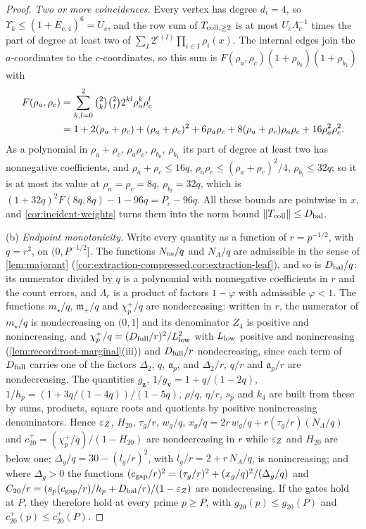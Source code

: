 \begin{proof}
\emph{Two or more coincidences.} Every vertex has degree $d_i=4$, so
$\Upsilon_k\le(1+E_{c,4})^6=U_c$, and the row sum of $T_{\rm coll,\ge2}$ is at
most $U_c\Lambda_c^{-1}$ times the part of degree at least two of
$\sum_I2^{e(I)}\prod_{i\in I}\rho_i(x)$. The internal edges join the
$a$-coordinates to the $c$-coordinates, so this sum is
$F(\rho_a,\rho_c)(1+\rho_{b_0})(1+\rho_{b_1})$ with
\begin{align*}
 F(\rho_a,\rho_c)&=\sum_{k,l=0}^2\tbinom2k\tbinom2l2^{kl}\rho_a^k\rho_c^l\\
 &=1+2(\rho_a+\rho_c)+(\rho_a+\rho_c)^2+6\rho_a\rho_c
 +8(\rho_a+\rho_c)\rho_a\rho_c+16\rho_a^2\rho_c^2 .
\end{align*}
As a polynomial in $\rho_a+\rho_c$, $\rho_a\rho_c$, $\rho_{b_0}$, $\rho_{b_1}$ its
part of degree at least two has nonnegative coefficients, and
$\rho_a+\rho_c\le16q$, $\rho_a\rho_c\le(\rho_a+\rho_c)^2/4$, $\rho_{b_l}\le32q$;
so it is at most its value at $\rho_a=\rho_c=8q$, $\rho_{b_l}=32q$, which is
$(1+32q)^2F(8q,8q)-1-96q=P_c-96q$. All these bounds are pointwise in $x$, and
\cref{cor:incident-weights} turns them into the norm bound
$\left\|T_{\rm coll}\right\|\le D_{\rm bal}$.

(b) \emph{Endpoint monotonicity.} Write every quantity as a function of
$r=p^{-1/2}$, with $q=r^2$, on $(0,P^{-1/2}]$. The functions $N_{\rm ns}/q$ and
$N_A/q$ are admissible in the sense of \cref{lem:majorant}
(\cref{cor:extraction-compressed,cor:extraction-leaf}), and so is
$D_{\rm bal}/q$: its numerator divided by $q$ is a polynomial with nonnegative
coefficients in $r$ and the count errors, and $\Lambda_c$ is a product of
factors $1-\varphi$ with admissible $\varphi<1$. The functions $m_\star/q$,
$\mathfrak m_+/q$ and $\chi^+_p/q$ are nondecreasing: written in $r$, the
numerator of $m_\star/q$ is nondecreasing on $(0,1]$ and its denominator $Z_4$
is positive and nonincreasing, and $\chi^+_p/q=(D_{\rm full}/r)^2/L_{\rm low}^2$
with $L_{\rm low}$ positive and nonincreasing (\cref{lem:record:root-marginal}(iii))
and $D_{\rm full}/r$ nondecreasing, since each term of $D_{\rm full}$ carries one
of the factors $\Delta_2$, $q$, $\mathfrak a_p$, and $\Delta_2/r$, $q/r$ and
$\mathfrak a_p/r$ are nondecreasing. The quantities $g_{\mathbf z}$,
$1/g_{\mathbf v}=1+q/(1-2q)$, $1/h_p=(1+3q/(1-4q))/(1-5q)$, $\rho/q$, $\eta/r$,
$s_p$ and $k_4$ are built from these by sums, products, square roots and
quotients by positive nonincreasing denominators. Hence $\varepsilon_Z$, $H_{20}$,
$\tau_g/r$, $w_g/q$, $x_g/q=2r\,w_g/q+r(\tau_g/r)(N_A/q)$ and
$c^+_{20}=(\chi^+_p/q)/(1-H_{20})$ are nondecreasing in $r$ while $\varepsilon_Z$ and
$H_{20}$ are below one; $\Delta_g/q=30-(l_g/r)^2$, with $l_g/r=2+r\,N_A/q$, is
nonincreasing; and where $\Delta_g>0$ the functions
$(c_{\rm gap}/r)^2=(\tau_g/r)^2+(x_g/q)^2/(\Delta_g/q)$ and
$C_{20}/r=(s_p(c_{\rm gap}/r)/h_p+D_{\rm bal}/r)/(1-\varepsilon_Z)$ are nondecreasing.
If the gates hold at $P$, they therefore hold at every prime $p\ge P$, with
$g_{20}(p)\le g_{20}(P)$ and $c^+_{20}(p)\le c^+_{20}(P)$.


\end{proof}

